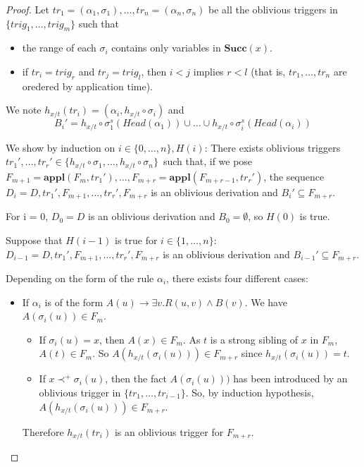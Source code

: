 \documentclass{article}
\theoremstyle{definition}
\theoremstyle{remark}
\newcommand{\Appl}{\textbf{appl}}
\newcommand{\su}{\textbf{Succ}}
\begin{document}
\begin{proof}
Let $tr_1 = (\alpha_1,\sigma_1),\ldots, tr_n =(\alpha_n,\sigma_n)$ be all the oblivious triggers in $\{trig_1,\ldots,trig_m\}$ such that
\begin{itemize}
\item the range of each $\sigma_i$ contains only variables in $\su(x)$.
\item if $tr_i = trig_r$ and $tr_j =trig_l$, then $i <j$ implies $r<l$ (that is, $tr_1,\ldots,tr_n$ are oredered by application time).
\end{itemize} 
We note $h_{x/t}(tr_i)=(\alpha_i,h_{x/t} \circ \sigma_i)$ and $$B_i' = {h_{x/t} \circ \sigma_1^s}(Head(\alpha_1)) \cup \ldots \cup {h_{x/t} \circ \sigma^s_i}(Head(\alpha_{i}))$$

We show by induction on $i \in \{0,\ldots, n\},H(i)$: There exists oblivious triggers $tr_1',\ldots,tr_r' \in \{h_{x/t} \circ \sigma_1,\ldots, h_{x/t} \circ \sigma_n\}$\ such that, if we pose $F_{m+1} = \Appl(F_m,tr_1'),\ldots,F_{m+r} = \Appl(F_{m+r-1},tr_r')$, the sequence $D_i = D,tr_1',F_{m+1},\ldots, tr_r',F_{m+r}$ is an oblivious derivation and $B_i' \subseteq F_{m+r}$. 

For i = 0, $D_0 = D$ is an oblivious derivation and $B_0 = \emptyset$, so $H(0)$ is true.

Suppose that $H(i-1)$ is true for $i \in \{1,\ldots,n\}$: $D_{i-1} = D,tr_1',F_{m+1},\ldots, tr_r',F_{m+r}$ is an oblivious derivation and $B_{i-1}' \subseteq F_{m+r}$.

Depending on the form of the rule $\alpha_i$, there exists four different cases:
	\begin{itemize}
	\item If $\alpha_i$ is of the form $A(u) \rightarrow \exists v.R(u,v) \wedge B(v)$. We have $A(\sigma_i(u)) \in F_m$.
		\begin{itemize}
		\item If $\sigma_i(u) = x$, then $A(x) \in F_m$. As $t$ is a strong sibling of $x$ in $F_m$, $A(t) \in F_m$. So $A(h_{x/t}(\sigma_i(u))) \in F_{m+r}$ since $h_{x/t}(\sigma_i(u)) = t$.  
		\item If $x \prec^+ \sigma_i(u)$, then the fact $A(\sigma_i(u)))$ has been introduced by an oblivious trigger in $\{tr_1,\ldots,tr_{i-1}\}$. So, by induction hypothesis, $A(h_{x/t}(\sigma_i(u))) \in F_{m+r}$.
		\end{itemize}
Therefore $h_{x/t}(tr_{i})$ is an oblivious trigger for $F_{m+r}$.


\end{itemize}
\end{proof}
\end{document}
